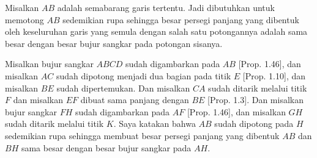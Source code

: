 \documentclass[a4paper]{book}
\begin{document}
\begin{center}
\end{center}

Misalkan $AB$ adalah semabarang garis tertentu. Jadi dibutuhkan untuk memotong
$AB$ sedemikian rupa sehingga besar persegi panjang yang dibentuk oleh 
keseluruhan garis yang semula dengan salah satu potongannya adalah sama besar
dengan besar bujur sangkar pada potongan sisanya.

Misalkan bujur sangkar $ABCD$ sudah digambarkan pada $AB$ [Prop. 1.46], dan 
misalkan $AC$ sudah dipotong menjadi dua bagian pada titik $E$ [Prop. 1.10],
dan misalkan $BE$ sudah dipertemukan. Dan misalkan $CA$ sudah ditarik melalui
titik $F$ dan misalkan $EF$ dibuat sama panjang dengan $BE$ [Prop. 1.3]. Dan
misalkan bujur sangkar $FH$ sudah digambarkan pada $AF$ [Prop. 1.46], dan 
misalkan $GH$ sudah ditarik melalui titik $K$. Saya katakan bahwa $AB$
sudah dipotong pada $H$ sedemikian rupa sehingga membuat besar persegi panjang
yang dibentuk $AB$ dan $BH$ sama besar dengan besar bujur sangkar pada $AH$.
\end{document}
